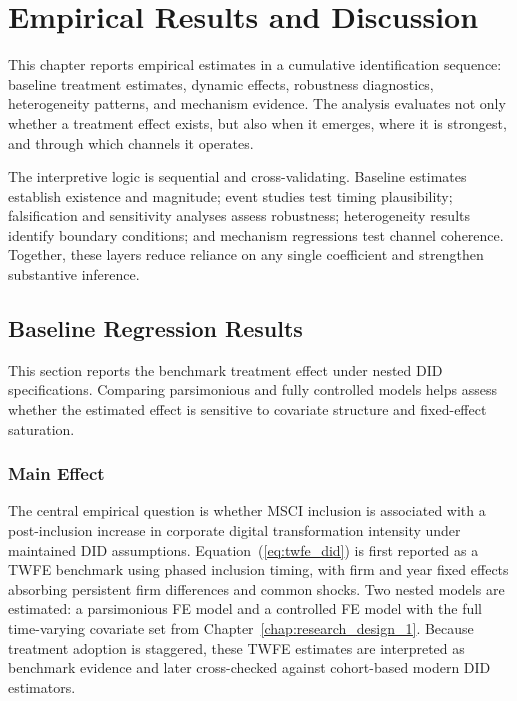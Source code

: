 \chapter{Empirical Results and Discussion}
\label{chap:empirical_results}

This chapter reports empirical estimates in a cumulative identification sequence: baseline treatment estimates, dynamic effects, robustness diagnostics, heterogeneity patterns, and mechanism evidence. The analysis evaluates not only whether a treatment effect exists, but also when it emerges, where it is strongest, and through which channels it operates.

The interpretive logic is sequential and cross-validating. Baseline estimates establish existence and magnitude; event studies test timing plausibility; falsification and sensitivity analyses assess robustness; heterogeneity results identify boundary conditions; and mechanism regressions test channel coherence. Together, these layers reduce reliance on any single coefficient and strengthen substantive inference.

\section{Baseline Regression Results}

This section reports the benchmark treatment effect under nested DID specifications. Comparing parsimonious and fully controlled models helps assess whether the estimated effect is sensitive to covariate structure and fixed-effect saturation.

\subsection{Main Effect}

The central empirical question is whether MSCI inclusion is associated with a post-inclusion increase in corporate digital transformation intensity under maintained DID assumptions. Equation~(\ref{eq:twfe_did}) is first reported as a TWFE benchmark using phased inclusion timing, with firm and year fixed effects absorbing persistent firm differences and common shocks. Two nested models are estimated: a parsimonious FE model and a controlled FE model with the full time-varying covariate set from Chapter~\ref{chap:research_design_1}. Because treatment adoption is staggered, these TWFE estimates are interpreted as benchmark evidence and later cross-checked against cohort-based modern DID estimators.

